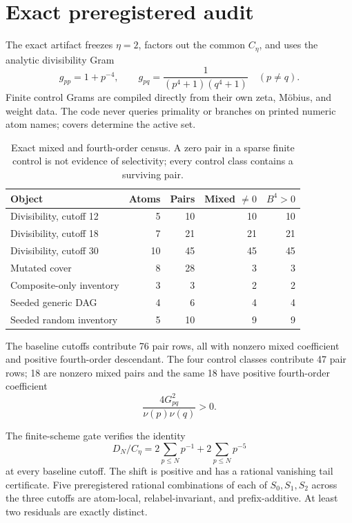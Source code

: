 \section{Exact preregistered audit}
\label{sec:audit}

The exact artifact freezes $\eta=2$, factors out the common $C_\eta$, and
uses the analytic divisibility Gram
\begin{equation}
 g_{pp}=1+p^{-4},
 \qquad
 g_{pq}=\frac1{(p^4+1)(q^4+1)}\quad(p\ne q).
 \label{eq:frozen-gram}
\end{equation}
Finite control Grams are compiled directly from their own zeta, M\"obius,
and weight data.  The code never queries primality or branches on printed
numeric atom names; covers determine the active set.

\begin{table}[H]
\centering
\small
\caption{Exact mixed and fourth-order census.  A zero pair in a sparse finite
control is not evidence of selectivity; every control class contains a
surviving pair.}
\label{tab:exact-census}
\begin{tabular}{L{0.37\textwidth}rrrr}
\toprule
Object & Atoms & Pairs & Mixed $\ne0$ & $B^4>0$\\
\midrule
Divisibility, cutoff 12 & 5 & 10 & 10 & 10\\
Divisibility, cutoff 18 & 7 & 21 & 21 & 21\\
Divisibility, cutoff 30 & 10 & 45 & 45 & 45\\
Mutated cover & 8 & 28 & 3 & 3\\
Composite-only inventory & 3 & 3 & 2 & 2\\
Seeded generic DAG & 4 & 6 & 4 & 4\\
Seeded random inventory & 5 & 10 & 9 & 9\\
\bottomrule
\end{tabular}
\end{table}

The baseline cutoffs contribute 76 pair rows, all with nonzero mixed
coefficient and positive fourth-order descendant.  The four control classes
contribute 47 pair rows; 18 are nonzero mixed pairs and the same 18 have
positive fourth-order coefficient
\begin{equation}
 \frac{4G_{pq}^2}{\nu(p)\nu(q)}>0.
 \label{eq:B4-pair}
\end{equation}

The finite-scheme gate verifies the identity
\begin{equation}
 D_N/C_\eta
 =2\sum_{p\le N}p^{-1}+2\sum_{p\le N}p^{-5}
 \label{eq:experimental-shift}
\end{equation}
at every baseline cutoff.  The shift is positive and has a rational vanishing
tail certificate.  Five preregistered rational combinations of each of
$S_0,S_1,S_2$ across the three cutoffs are atom-local, relabel-invariant, and
prefix-additive.  At least two residuals are exactly distinct.

